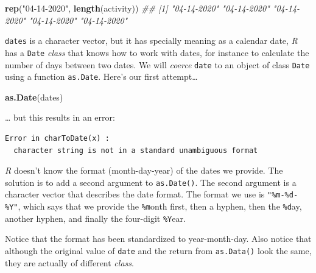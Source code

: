 \documentclass[
]{book}
\newenvironment{Shaded}{\begin{snugshade}}{\end{snugshade}}
\newcommand{\CommentTok}[1]{\textcolor[rgb]{0.56,0.35,0.01}{\textit{#1}}}
\newcommand{\DataTypeTok}[1]{\textcolor[rgb]{0.13,0.29,0.53}{#1}}
\newcommand{\KeywordTok}[1]{\textcolor[rgb]{0.13,0.29,0.53}{\textbf{#1}}}
\newcommand{\NormalTok}[1]{#1}
\newcommand{\StringTok}[1]{\textcolor[rgb]{0.31,0.60,0.02}{#1}}
\begin{document}
\begin{Shaded}
\begin{Highlighting}[]
\KeywordTok{rep}\NormalTok{(}\StringTok{"04-14-2020"}\NormalTok{, }\KeywordTok{length}\NormalTok{(activity))}
\CommentTok{## [1] "04-14-2020" "04-14-2020" "04-14-2020" "04-14-2020" "04-14-2020"}
\end{Highlighting}
\end{Shaded}

\texttt{dates} is a character vector, but it has specially meaning as a calendar date, \emph{R} has a \texttt{Date} \emph{class} that knows how to work with dates, for instance to calculate the number of days between two dates. We will \emph{coerce} \texttt{date} to an object of class \texttt{Date} using a function \texttt{as.Date}. Here's our first attempt\ldots{}

\begin{Shaded}
\begin{Highlighting}[]
\KeywordTok{as.Date}\NormalTok{(dates)}
\end{Highlighting}
\end{Shaded}

\ldots{} but this results in an error:

\begin{verbatim}
Error in charToDate(x) :
  character string is not in a standard unambiguous format
\end{verbatim}

\emph{R} doesn't know the format (month-day-year) of the dates we provide. The solution is to add a second argument to \texttt{as.Date()}. The second argument is a character vector that describes the date format. The format we use is \texttt{"\%m-\%d-\%Y"}, which says that we provide the \texttt{\%m}onth first, then a hyphen, then the \texttt{\%d}ay, another hyphen, and finally the four-digit \texttt{\%Y}ear.

\begin{Shaded}
\end{Shaded}

Notice that the format has been standardized to year-month-day. Also notice that although the original value of \texttt{date} and the return from \texttt{as.Data()} look the same, they are actually of different \emph{class}.
\end{document}
